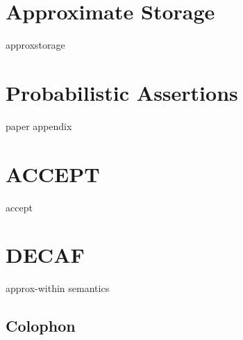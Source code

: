 \documentclass[ twoside,openright,titlepage,numbers=noenddot,headinclude,
                footinclude=true,cleardoublepage=empty,abstractoff,%
                BCOR=5mm,paper=letter,fontsize=11pt,letterpaper,%
                american,%
                ]{scrreprt}
\newcounter{dummy}
\begin{document}
\chapter{Approximate Storage}
\label{ch:approxstorage}
{approxstorage}


\chapter{Probabilistic Assertions}
\label{ch:passert}
{paper}
{appendix}


\chapter{ACCEPT}
\label{ch:accept}
{accept}


\chapter{DECAF}
\label{ch:decaf}
{approx-within}
{semantics}


\manualmark
\markboth{\spacedlowsmallcaps{\bibname}}{\spacedlowsmallcaps{\bibname}} %
{}

\label{app:bibliography}



\cleardoublepage
\pagestyle{empty}
\vspace*{20ex}
\section*{Colophon}

\end{document}
